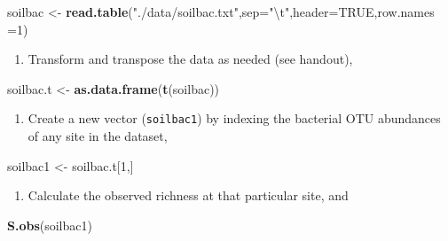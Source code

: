 \documentclass[
]{article}
\newenvironment{Shaded}{\begin{snugshade}}{\end{snugshade}}
\newcommand{\CharTok}[1]{\textcolor[rgb]{0.31,0.60,0.02}{#1}}
\newcommand{\DataTypeTok}[1]{\textcolor[rgb]{0.13,0.29,0.53}{#1}}
\newcommand{\DecValTok}[1]{\textcolor[rgb]{0.00,0.00,0.81}{#1}}
\newcommand{\KeywordTok}[1]{\textcolor[rgb]{0.13,0.29,0.53}{\textbf{#1}}}
\newcommand{\NormalTok}[1]{#1}
\newcommand{\OtherTok}[1]{\textcolor[rgb]{0.56,0.35,0.01}{#1}}
\newcommand{\StringTok}[1]{\textcolor[rgb]{0.31,0.60,0.02}{#1}}
\providecommand{\tightlist}{%
  \setlength{\itemsep}{0pt}\setlength{\parskip}{0pt}}
\begin{document}
\begin{Shaded}
\begin{Highlighting}[]
\NormalTok{soilbac <-}\StringTok{ }\KeywordTok{read.table}\NormalTok{(}\StringTok{"./data/soilbac.txt"}\NormalTok{,}\DataTypeTok{sep=}\StringTok{"}\CharTok{\textbackslash{}t}\StringTok{"}\NormalTok{,}\DataTypeTok{header=}\OtherTok{TRUE}\NormalTok{,}\DataTypeTok{row.names =}\DecValTok{1}\NormalTok{)}
\end{Highlighting}
\end{Shaded}

\begin{enumerate}
\def\labelenumi{\arabic{enumi}.}
\setcounter{enumi}{1}
\tightlist
\item
  Transform and transpose the data as needed (see handout),
\end{enumerate}

\begin{Shaded}
\begin{Highlighting}[]
\NormalTok{soilbac.t <-}\StringTok{ }\KeywordTok{as.data.frame}\NormalTok{(}\KeywordTok{t}\NormalTok{(soilbac))}
\end{Highlighting}
\end{Shaded}

\begin{enumerate}
\def\labelenumi{\arabic{enumi}.}
\setcounter{enumi}{2}
\tightlist
\item
  Create a new vector (\texttt{soilbac1}) by indexing the bacterial OTU
  abundances of any site in the dataset,
\end{enumerate}

\begin{Shaded}
\begin{Highlighting}[]
\NormalTok{soilbac1 <-}\StringTok{ }\NormalTok{soilbac.t[}\DecValTok{1}\NormalTok{,]}
\end{Highlighting}
\end{Shaded}

\begin{enumerate}
\def\labelenumi{\arabic{enumi}.}
\setcounter{enumi}{3}
\tightlist
\item
  Calculate the observed richness at that particular site, and
\end{enumerate}

\begin{Shaded}
\begin{Highlighting}[]
\KeywordTok{S.obs}\NormalTok{(soilbac1)}
\end{Highlighting}
\end{Shaded}
\end{document}
